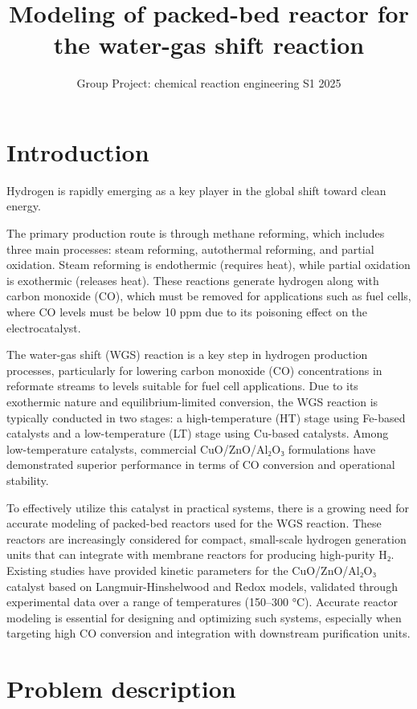 \documentclass[
  12pt,
  a4paperpaper,
  DIV=11,
  numbers=noendperiod]{scrartcl}
\title{Modeling of packed-bed reactor for the water-gas shift reaction}
\subtitle{Group Project: chemical reaction engineering S1 2025}
\author{}
\date{}
\begin{document}
\maketitle


\section{Introduction}\label{introduction}

Hydrogen is rapidly emerging as a key player in the global shift toward
clean energy.

The primary production route is through methane reforming, which
includes three main processes: steam reforming, autothermal reforming,
and partial oxidation. Steam reforming is endothermic (requires heat),
while partial oxidation is exothermic (releases heat). These reactions
generate hydrogen along with carbon monoxide (CO), which must be removed
for applications such as fuel cells, where CO levels must be below 10
ppm due to its poisoning effect on the electrocatalyst.

The water-gas shift (WGS) reaction is a key step in hydrogen production
processes, particularly for lowering carbon monoxide (CO) concentrations
in reformate streams to levels suitable for fuel cell applications. Due
to its exothermic nature and equilibrium-limited conversion, the WGS
reaction is typically conducted in two stages: a high-temperature (HT)
stage using Fe-based catalysts and a low-temperature (LT) stage using
Cu-based catalysts. Among low-temperature catalysts, commercial
CuO/ZnO/Al₂O₃ formulations have demonstrated superior performance in
terms of CO conversion and operational stability.

To effectively utilize this catalyst in practical systems, there is a
growing need for accurate modeling of packed-bed reactors used for the
WGS reaction. These reactors are increasingly considered for compact,
small-scale hydrogen generation units that can integrate with membrane
reactors for producing high-purity H₂. Existing studies have provided
kinetic parameters for the CuO/ZnO/Al₂O₃ catalyst based on
Langmuir-Hinshelwood and Redox models, validated through experimental
data over a range of temperatures (150--300 °C). Accurate reactor
modeling is essential for designing and optimizing such systems,
especially when targeting high CO conversion and integration with
downstream purification units.

\section{Problem description}\label{problem-description}
\end{document}
